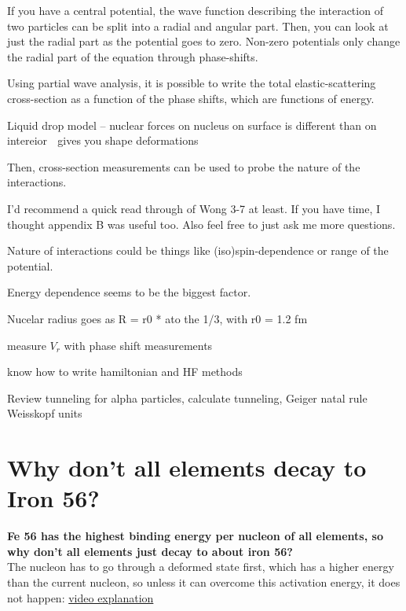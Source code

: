 
If you have a central potential, the wave function describing the interaction of two particles can be split into a radial and angular part.  Then, you can look at just the radial part as the potential goes to zero.  Non-zero potentials only change the radial part of the equation through phase-shifts.



Using partial wave analysis, it is possible to write the total elastic-scattering cross-section as a function of the phase shifts, which are functions of energy.



Liquid drop model – nuclear forces on nucleus on surface is different than on intereior  gives you shape deformations



Then, cross-section measurements can be used to probe the nature of the interactions.



I'd recommend a quick read through of Wong 3-7 at least.  If you have time, I thought appendix B was useful too.  Also feel free to just ask me more questions.



Nature of interactions could be things like (iso)spin-dependence or range of the potential.



Energy dependence seems to be the biggest factor.


Nucelar radius goes as R = r0 * ato the 1/3, with r0 = 1.2 fm

  measure $V_r$ with phase shift measurements 

know how to write hamiltonian and HF methods

Review tunneling for alpha particles, calculate tunneling, Geiger natal rule
Weisskopf units

        
    \section{Why don't all elements decay to Iron 56?}
        \textbf{Fe 56 has the highest binding energy per nucleon of all elements, so why don't all elements just decay to about iron 56?}\\
        \newline
        \indent The nucleon has to go through a deformed state first, which has a higher energy than the current nucleon, so unless it can overcome this activation energy, it does not happen: \href{https://www.youtube.com/watch?v=cMYJKjBHIiA}{video explanation}
 
